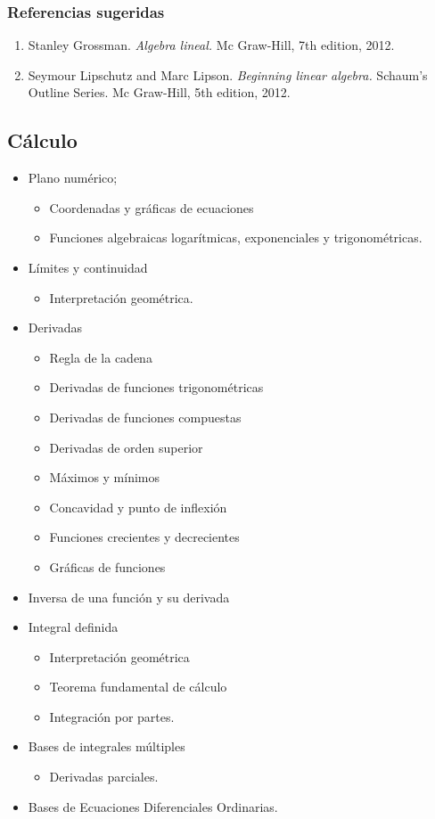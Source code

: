 \documentclass[10pt,a4paper]{book}
\begin{document}
\subsubsection{Referencias sugeridas}
\begin{enumerate}
	\item Stanley Grossman. \textit{Algebra lineal.} Mc Graw-Hill, 7th edition, 2012.
	\item Seymour Lipschutz and Marc Lipson. \textit{Beginning linear algebra.} Schaum’s Outline Series. Mc Graw-Hill, 5th edition, 2012.
\end{enumerate}

\newpage

\subsection{Cálculo}

\begin{itemize}
	\item Plano numérico; 
	\begin{itemize}
		\item Coordenadas y gráficas de ecuaciones
		\item Funciones algebraicas logarítmicas, exponenciales y trigonométricas.
	\end{itemize}		
	\item Límites y continuidad
	\begin{itemize}
		\item Interpretación geométrica.
	\end{itemize}
	\item Derivadas
	\begin{itemize}
		\item Regla de la cadena
		\item Derivadas de funciones trigonométricas
		\item Derivadas de funciones compuestas
		\item Derivadas de orden superior
		\item Máximos y mínimos
		\item Concavidad y punto de inflexión
		\item Funciones crecientes y decrecientes
		\item Gráficas de funciones
	\end{itemize}		
	\item Inversa de una función y su derivada
	\item Integral definida 
	\begin{itemize}
		\item Interpretación geométrica
		\item Teorema fundamental de cálculo
		\item Integración por partes.
	\end{itemize}
	\item Bases de integrales múltiples
	\begin{itemize}
		\item Derivadas parciales.
	\end{itemize}
	\item Bases de Ecuaciones Diferenciales Ordinarias.
\end{itemize}
\end{document}
